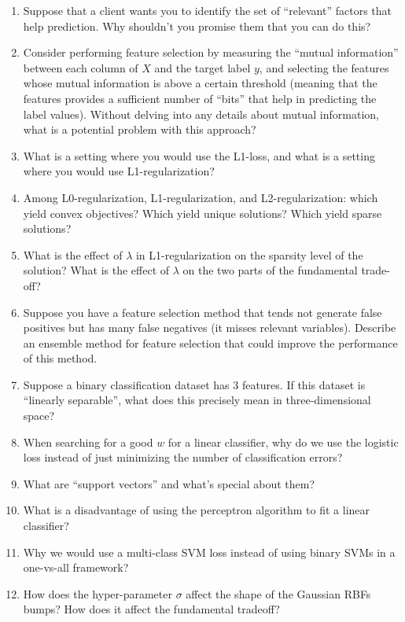 \documentclass{article}
\def\enum#1{\begin{enumerate}#1\end{enumerate}}
\begin{document}
\enum{
\item Suppose that a client wants you to identify the set of ``relevant'' factors that help prediction. Why shouldn't you promise them that you can do this?
\item Consider performing feature selection by measuring the ``mutual information'' between each column of $X$ and the target label $y$, and selecting the features whose mutual information is above a certain threshold (meaning that the features provides a sufficient number of ``bits'' that help in predicting the label values). Without delving into any details about mutual information, what is a potential problem with this approach?
\item What is a setting where you would use the L1-loss, and what is a setting where you would use L1-regularization?
\item Among L0-regularization, L1-regularization, and L2-regularization: which yield convex objectives? Which yield unique solutions? Which yield sparse solutions?
\item What is the effect of $\lambda$ in L1-regularization on the sparsity level of the solution? What is the effect of $\lambda$ on the two parts of the fundamental trade-off?
\item Suppose you have a feature selection method that tends not generate false positives but has many false negatives (it misses relevant variables). Describe an ensemble method for feature selection that could improve the performance of this method.
\item Suppose a binary classification dataset has 3 features. If this dataset is ``linearly separable'', what does this precisely mean in three-dimensional space?
\item When searching for a good $w$ for a linear classifier, why do we use the logistic loss instead of just minimizing the number of classification errors?
\item What are ``support vectors'' and what's special about them?
\item What is a disadvantage of using the perceptron algorithm to fit a linear classifier?
\item Why we would use a multi-class SVM loss instead of using binary SVMs in a one-vs-all framework?
\item How does the hyper-parameter $\sigma$ affect the shape of the Gaussian RBFs bumps? How does it affect the fundamental tradeoff?
}
\end{document}
